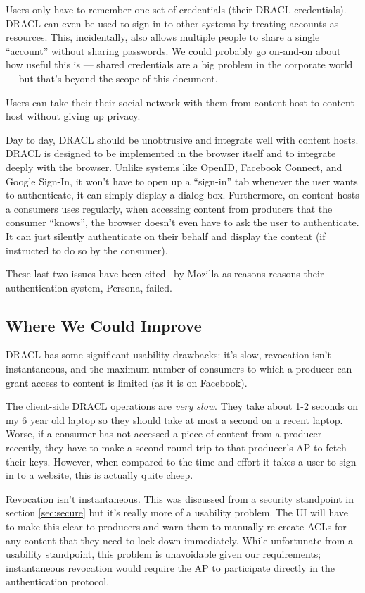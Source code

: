 \documentclass[pdftex,12pt,a4papaer,twoside,notitlepage]{report}
\begin{document}
Users only have to remember one set of credentials (their DRACL credentials).
DRACL can even be used to sign in to other systems by treating accounts as
resources. This, incidentally, also allows multiple people to share a single
``account'' without sharing passwords. We could probably go on-and-on about how
useful this is --- shared credentials are a big problem in the corporate world
--- but that's beyond the scope of this document.

Users can take their their social network with them from content host to content
host without giving up privacy.

Day to day, DRACL should be unobtrusive and integrate well with content hosts.
DRACL is designed to be implemented in the browser itself and to integrate
deeply with the browser. Unlike systems like OpenID, Facebook Connect, and
Google Sign-In, it won't have to open up a ``sign-in'' tab whenever the user
wants to authenticate, it can simply display a dialog box. Furthermore, on
content hosts a consumers uses regularly, when accessing content from producers
that the consumer ``knows'', the browser doesn't even have to ask the user to
authenticate. It can just silently authenticate on their behalf and display the
content (if instructed to do so by the consumer).

These last two issues have been cited~\cite{persona-fail} by Mozilla as reasons
reasons their authentication system, Persona, failed.

\subsection{Where We Could Improve}
\label{sec:usability_improve}

DRACL has some significant usability drawbacks: it's slow, revocation isn't
instantaneous, and the maximum number of consumers to which a producer can grant
access to content is limited (as it is on Facebook).

The client-side DRACL operations are \emph{very slow}. They take about 1-2
seconds on my 6 year old laptop so they should take at most a second on a recent
laptop. Worse, if a consumer has not accessed a piece of content from a producer
recently, they have to make a second round trip to that producer's AP to fetch
their keys. However, when compared to the time and effort it takes a user to
sign in to a website, this is actually quite cheep.

Revocation isn't instantaneous. This was discussed from a security standpoint in
section \cref{sec:secure} but it's really more of a usability problem. The UI
will have to make this clear to producers and warn them to manually re-create
ACLs for any content that they need to lock-down immediately. While unfortunate
from a usability standpoint, this problem is unavoidable given our requirements;
instantaneous revocation would require the AP to participate directly in the
authentication protocol.
\end{document}

